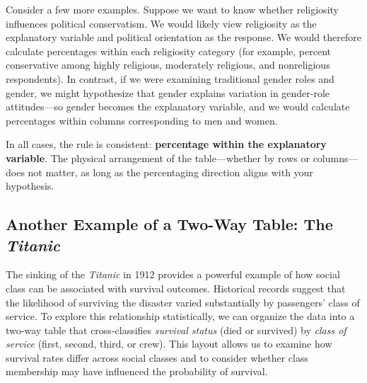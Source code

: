 \documentclass[
  letterpaper,
  DIV=11,
  numbers=noendperiod]{scrreprt}
\begin{document}
Consider a few more examples. Suppose we want to know whether
religiosity influences political conservatism. We would likely view
religiosity as the explanatory variable and political orientation as the
response. We would therefore calculate percentages within each
religiosity category (for example, percent conservative among highly
religious, moderately religious, and nonreligious respondents). In
contrast, if we were examining traditional gender roles and gender, we
might hypothesize that gender explains variation in gender-role
attitudes---so gender becomes the explanatory variable, and we would
calculate percentages within columns corresponding to men and women.

In all cases, the rule is consistent: \textbf{percentage within the
explanatory variable}. The physical arrangement of the table---whether
by rows or columns---does not matter, as long as the percentaging
direction aligns with your hypothesis.

\subsection{\texorpdfstring{Another Example of a Two-Way Table: The
\emph{Titanic}}{Another Example of a Two-Way Table: The Titanic}}\label{another-example-of-a-two-way-table-the-titanic}

The sinking of the \emph{Titanic} in 1912 provides a powerful example of
how social class can be associated with survival outcomes. Historical
records suggest that the likelihood of surviving the disaster varied
substantially by passengers' class of service. To explore this
relationship statistically, we can organize the data into a two-way
table that cross-classifies \emph{survival status} (died or survived) by
\emph{class of service} (first, second, third, or crew). This layout
allows us to examine how survival rates differ across social classes and
to consider whether class membership may have influenced the probability
of survival.
\end{document}
